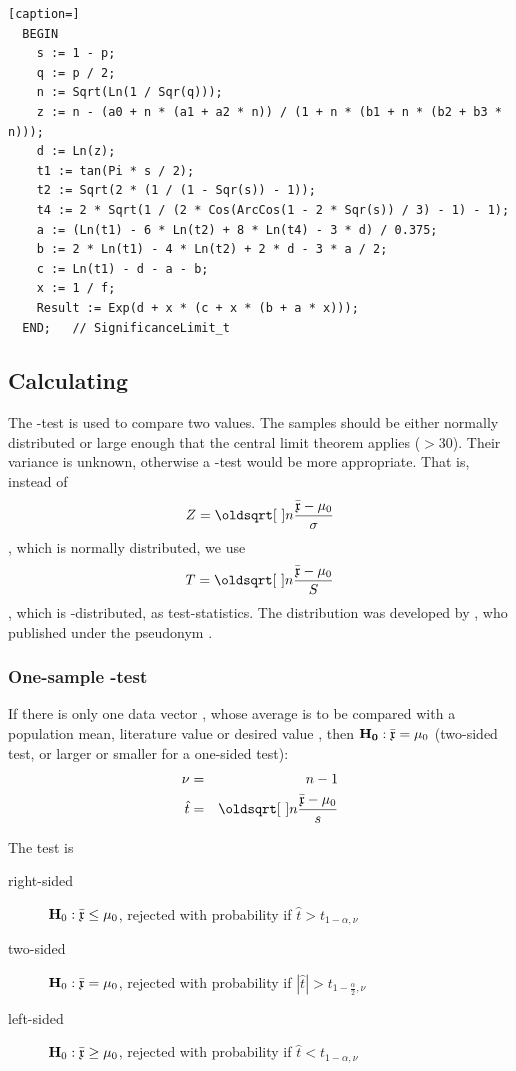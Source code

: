 \begin{refsection}
\begin{lstlisting}[caption=]
  BEGIN
    s := 1 - p;
    q := p / 2;
    n := Sqrt(Ln(1 / Sqr(q)));
    z := n - (a0 + n * (a1 + a2 * n)) / (1 + n * (b1 + n * (b2 + b3 * n)));
    d := Ln(z);
    t1 := tan(Pi * s / 2);
    t2 := Sqrt(2 * (1 / (1 - Sqr(s)) - 1));
    t4 := 2 * Sqrt(1 / (2 * Cos(ArcCos(1 - 2 * Sqr(s)) / 3) - 1) - 1);
    a := (Ln(t1) - 6 * Ln(t2) + 8 * Ln(t4) - 3 * d) / 0.375;
    b := 2 * Ln(t1) - 4 * Ln(t2) + 2 * d - 3 * a / 2;
    c := Ln(t1) - d - a - b;
    x := 1 / f;
    Result := Exp(d + x * (c + x * (b + a * x)));
  END;   // SignificanceLimit_t
\end{lstlisting}

\subsection{Calculating }

The -test is used to compare two values. The samples should be either normally distributed or large enough that the central limit theorem applies (\( > 30 \)). Their variance is unknown, otherwise a -test would be more appropriate. That is, instead of \[ Z = \sqrt{n} \frac{\bar{\AbsVec{x}} - \mu_0}{\sigma} \], which is normally distributed, we use \[ T = \sqrt{n} \frac{\bar{\AbsVec{x}} - \mu_0}{S} \], which is -distributed, as test-statistics. The distribution was developed by , who published under the pseudonym  \parencite{Stu-08}.

\subsubsection{One-sample -test}

If there is only one data vector , whose average is to be compared with a population mean, literature value or desired value , then \( \mathbf{H_0}: \bar{\mathfrak{x}} = \mu_0 \) (two-sided test, or larger or smaller for a one-sided test):
\begin{eqnarray}
  \nonumber %
  \nu     &=& n - 1 \\
  \hat{t} &=& \sqrt{n} \frac{\bar{\AbsVec{x}} - \mu_0}{s}
\end{eqnarray}

The test is
\begin{description}
  \item[right-sided]{\( \mathbf{H}_0: \bar{\mathfrak{x}} \leq \mu_0 \), rejected with probability \skalar{\alpha} if  \( \hat{t} > t_{1-\alpha, \nu}  \)}
  \item[two-sided]{\( \mathbf{H}_0: \bar{\mathfrak{x}}  = \mu_0 \), rejected with probability \skalar{\alpha} if  \( |\hat{t}| > t_{1-\frac{\alpha}{2}, \nu} \)}
  \item[left-sided]{\( \mathbf{H}_0: \bar{\mathfrak{x}}  \geq \mu_0 \), rejected with probability \skalar{\alpha} if  \( \hat{t} < t_{1-\alpha, \nu}  \)}
\end{description}



\end{refsection}
